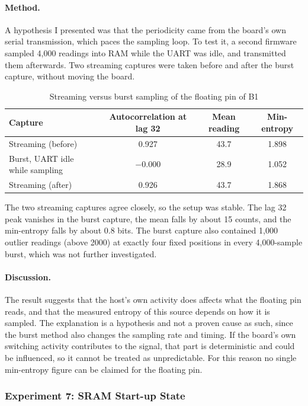 \documentclass[a4paper, 12pt]{article}
\begin{document}
\paragraph{Method.} A hypothesis I presented was that the periodicity came from the board's own serial transmission, which paces the sampling loop. To test it, a second firmware sampled 4,000 readings into RAM while the UART was idle, and transmitted them afterwards. Two streaming captures were taken before and after the burst capture, without moving the board.
  
\begin{table}[htbp]
\centering
\small
\caption{Streaming versus burst sampling of the floating pin of B1}
\label{tab:bp_e6}
\begin{tabularx}{\textwidth}{@{}Xccc@{}}
\toprule
\textbf{Capture} & \textbf{Autocorrelation at lag 32} & \textbf{Mean reading} & \textbf{Min-entropy} \\
\midrule
Streaming (before) & 0.927 & 43.7 & 1.898 \\
Burst, UART idle while sampling & $-0.000$ & 28.9 & 1.052 \\
Streaming (after) & 0.926 & 43.7 & 1.868 \\
\bottomrule
\end{tabularx}
\end{table}
 
The two streaming captures agree closely, so the setup was stable. The lag 32 peak vanishes in the burst capture, the mean falls by about 15 counts, and the min-entropy falls by about 0.8 bits. The burst capture also contained 1,000 outlier readings (above 2000) at exactly four fixed positions in every 4,000-sample burst, which was not further investigated.
 
\paragraph{Discussion.} The result suggests that the host's own activity does affects what the floating pin reads, and that the measured entropy of this source depends on how it is sampled. The explanation is a hypothesis and not a proven cause as such, since the burst method also changes the sampling rate and timing. If the board's own switching activity contributes to the signal, that part is deterministic and could be influenced, so it cannot be treated as unpredictable. For this reason no single min-entropy figure can be claimed for the floating pin.
 
\subsubsection{Experiment 7: SRAM Start-up State}
 
\end{document}

